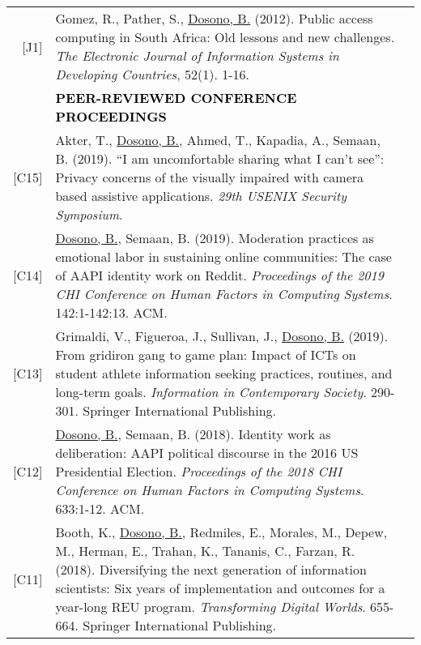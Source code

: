 \documentclass[11pt]{article}
\begin{document}
{{\begin{longtable}{Rp{0.75in}p{5.0in}}
\footnotesize{[J1]} & Gomez, R., Pather, S., \href{https://doi.org/10.1002/j.1681-4835.2012.tb00366.x}{Dosono, B.} (2012). Public access computing in South Africa: Old lessons and new challenges. \textit{The Electronic Journal of Information Systems in Developing Countries}, 52(1). 1-16.\\

& \textcolor{black}{\uppercase{\textbf{Peer-reviewed Conference Proceedings}}}\\

\footnotesize{[C15]} & Akter, T., \href{https://www.usenix.org/conference/usenixsecurity20/presentation/akter}{Dosono, B.}, Ahmed, T., Kapadia, A., Semaan, B. (2019). ``I am uncomfortable sharing what I can't see'': Privacy concerns of the visually impaired with camera based assistive applications. \textit{29th {USENIX} Security Symposium}.\\

\footnotesize{[C14]} & \href{https://dl.acm.org/authorize?N680367}{Dosono, B.}, Semaan, B. (2019). Moderation practices as emotional labor in sustaining online communities: The case of AAPI identity work on Reddit. \textit{Proceedings of the 2019 CHI Conference on Human Factors in Computing Systems}. 142:1-142:13. ACM.\\

\footnotesize{[C13]} & Grimaldi, V., Figueroa, J., Sullivan, J., \href{https://doi.org/10.1007/978-3-030-15742-5_29}{Dosono, B.} (2019). From gridiron gang to game plan: Impact of ICTs on student athlete information seeking practices, routines, and long-term goals. \textit{Information in Contemporary Society}. 290-301. Springer International Publishing.\\

\footnotesize{[C12]} & \href{https://dl.acm.org/authorize?N658208}{Dosono, B.}, Semaan, B. (2018). Identity work as deliberation: AAPI political discourse in the 2016 US Presidential Election. \textit{Proceedings of the 2018 CHI Conference on Human Factors in Computing Systems}. 633:1-12. ACM.\\

\footnotesize{[C11]} & Booth, K., \href{https://doi.org/10.1007/978-3-319-78105-1_75}{Dosono, B.}, Redmiles, E., Morales, M., Depew, M., Herman, E., Trahan, K., Tananis, C., Farzan, R. (2018). Diversifying the next generation of information scientists: Six years of implementation and outcomes for a year-long REU program. \textit{Transforming Digital Worlds}. 655-664. Springer International Publishing.\\


\end{longtable}}}
\end{document}
